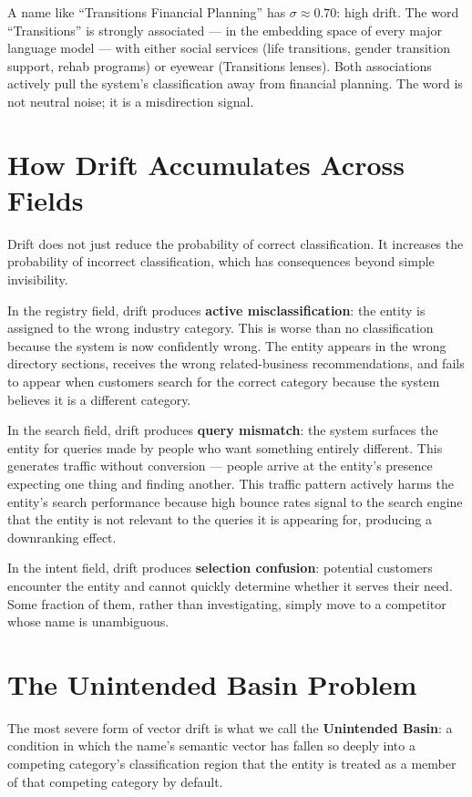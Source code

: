 \documentclass[12pt, openany]{book}
\theoremstyle{thmstyle}
\theoremstyle{defstyle}
\begin{document}
A name like ``Transitions Financial Planning'' has $\sigma \approx 0.70$: high drift. The word ``Transitions'' is strongly associated --- in the embedding space of every major language model --- with either social services (life transitions, gender transition support, rehab programs) or eyewear (Transitions lenses). Both associations actively pull the system's classification away from financial planning. The word is not neutral noise; it is a misdirection signal.

\section{How Drift Accumulates Across Fields}

Drift does not just reduce the probability of correct classification. It increases the probability of incorrect classification, which has consequences beyond simple invisibility.

In the registry field, drift produces \textbf{active misclassification}: the entity is assigned to the wrong industry category. This is worse than no classification because the system is now confidently wrong. The entity appears in the wrong directory sections, receives the wrong related-business recommendations, and fails to appear when customers search for the correct category because the system believes it is a different category.

In the search field, drift produces \textbf{query mismatch}: the system surfaces the entity for queries made by people who want something entirely different. This generates traffic without conversion --- people arrive at the entity's presence expecting one thing and finding another. This traffic pattern actively harms the entity's search performance because high bounce rates signal to the search engine that the entity is not relevant to the queries it is appearing for, producing a downranking effect.

In the intent field, drift produces \textbf{selection confusion}: potential customers encounter the entity and cannot quickly determine whether it serves their need. Some fraction of them, rather than investigating, simply move to a competitor whose name is unambiguous.

\section{The Unintended Basin Problem}

The most severe form of vector drift is what we call the \textbf{Unintended Basin}: a condition in which the name's semantic vector has fallen so deeply into a competing category's classification region that the entity is treated as a member of that competing category by default.
\end{document}
